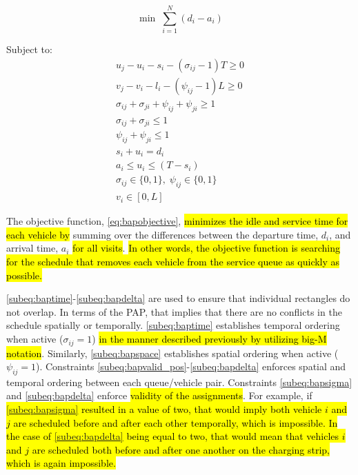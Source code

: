 \documentclass[utf8]{FrontiersinHarvard}
\begin{document}
\begin{equation}
	\label{eq:bapobjective}
	\min\; \sum_{i=1}^N (d_i - a_i)
\end{equation}

Subject to:
\begin{subequations}
\label{eq:bapconstrs}
\begin{align}
    u_j - u_i - s_i - (\sigma_{ij} - 1)T \geq 0   \label{subeq:baptime}          \\
    v_j - v_i - l_i - (\psi_{ij} - 1)L \geq 0   \label{subeq:bapspace}           \\
    \sigma_{ij} + \sigma_{ji} + \psi_{ij} + \psi_{ji} \geq 1 \label{subeq:bapvalid_pos}     \\
    \sigma_{ij} + \sigma_{ji} \leq 1                   \label{subeq:bapsigma}        \\
    \psi_{ij} + \psi_{ji} \leq 1                   \label{subeq:bapdelta}        \\
    s_i + u_i = d_i                       \label{subeq:bapdetach}       \\
    a_i \leq u_i \leq (T - s_i)                 \label{subeq:bapvalid_starts} \\
    \sigma_{ij} \in \{0,1\},\;\psi_{ij} \in \{0,1\}\; \label{subeq:bapsdspace}      \\
    v_i \in [0, L ]                         \label{subeq:bapvspace}
\end{align}
\end{subequations}

\noindent The objective function, \autoref{eq:bapobjective}, \hl{minimizes the idle and service time for each vehicle by} summing over the differences between the departure time, \(d_i\), and arrival time, \(a_i\) \hl{for all visits}. \hl{In other words, the objective function is searching for the schedule that removes each vehicle from the service queue as quickly as possible.}

\autoref{subeq:baptime}-\autoref{subeq:bapdelta} are used to ensure that individual rectangles do not overlap. In terms
of the PAP, that implies that there are no conflicts in the schedule spatially or temporally. \autoref{subeq:baptime}
establishes temporal ordering when active (\(\sigma_{ij}=1\)) \hl{in the manner described previously by utilizing big-M notation}. Similarly, \autoref{subeq:bapspace} establishes spatial ordering when active (\(\psi_{ij} =1\)).
Constraints \autoref{subeq:bapvalid_pos}-\autoref{subeq:bapdelta} enforces spatial and temporal ordering between each
queue/vehicle pair. Constraints \autoref{subeq:bapsigma} and \autoref{subeq:bapdelta} enforce \hl{validity of the assignments}. For example, if \hl{{\autoref{subeq:bapsigma}} resulted in a value of two, that would imply both vehicle $i$ and $j$ are scheduled before and after each other temporally, which is impossible. In the case of {\autoref{subeq:bapdelta}} being equal to two, that would mean that vehicles $i$ and $j$ are scheduled both before and after one another on the charging strip, which is again impossible.}
\end{document}
